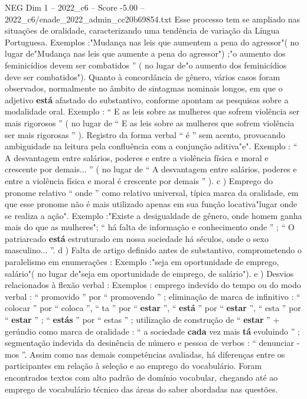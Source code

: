 \begin{textsample}{NEG Dim 1 – 2022\_c6 – Score -5.00 – 2022\_c6/enade\_2022\_admin\_cc20b69854.txt}
Esse processo tem se ampliado nas situações de oralidade, caracterizando uma tendência de variação da Língua Portuguesa.
Exemplos :"Mudança nas leis que aumentem a pena do agressor"( no lugar de"Mudança nas leis que aumente a pena do agressor") ;"o aumento dos feminicídios devem ser combatidos ” ( no lugar de"o aumento dos feminicídios deve ser combatidos").
Quanto à concordância de gênero, vários casos foram observados, normalmente no âmbito de sintagmas nominais longos, em que o adjetivo \textbf{está} afastado do substantivo, conforme apontam as pesquisas sobre a modalidade oral.
Exemplo : “ E as leis sobre as mulheres que sofrem violência ser mais rigorosos ” ( no lugar de “ E as leis sobre as mulheres que sofrem violência ser mais rigorosas ” ).
Registro da forma verbal “ é ” sem acento, provocando ambiguidade na leitura pela confluência com a conjunção aditiva"e".
Exemplo : “ A desvantagem entre salários, poderes e entre a violência física e moral e crescente por demais... ” ( no lugar de “ A desvantagem entre salários, poderes e entre a violência física e moral é crescente por demais ” ). c ) Emprego do pronome relativo “ onde ” como relativo universal, típica marca da oralidade, em que esse pronome não é mais utilizado apenas em sua função locativa"lugar onde se realiza a ação".
Exemplo :"Existe a desigualdade de gênero, onde homem ganha mais do que as mulheres"; “ há falta de informação e conhecimento onde ” ; “ O patriarcado \textbf{está} estruturado em nossa sociedade há séculos, onde o sexo masculino... ”. d ) Falta de artigo definido antes de substantivo, comprometendo o paralelismo em enumerações : Exemplo :"seja em oportunidade de emprego, salário"( no lugar de"seja em oportunidade de emprego, de salário"). e ) Desvios relacionados à flexão verbal : Exemplos : emprego indevido do tempo ou do modo verbal : “ promovido ” por “ promovendo ” ; eliminação de marca de infinitivo : “ colocar ” por “ coloca ”, “ ta ” por “ \textbf{estar} ”, “ \textbf{está} ” por “ \textbf{estar} ”, “ esta ” por “ \textbf{estar} ” ; “ \textbf{estás} ” por “ estas ” ; utilização de construção de “ \textbf{estar} ” + gerúndio como marca de oralidade : “ a sociedade \textbf{cada} vez mais \textbf{tá} evoluindo ” ; segmentação indevida da desinência de número e pessoa de verbos : “ denunciar -mos ”.
Assim como nas demais competências avaliadas, há diferenças entre os participantes em relação à seleção e ao emprego do vocabulário.
Foram encontrados textos com alto padrão de domínio vocabular, chegando até ao emprego de vocabulário técnico das áreas do saber abordadas nas questões.

\end{textsample}
